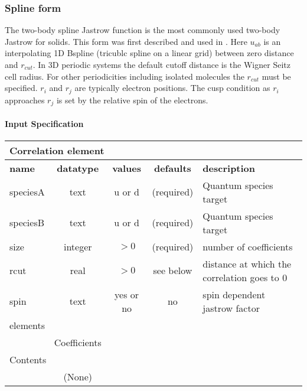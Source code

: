 \subsubsection{Spline form}
\label{sec:twobodyjastrowspline}

The two-body spline Jastrow function is the most commonly used two-body Jastrow for solids. This form 
was first described and used in \cite{EslerKimCeperleyShulenburger2012}.  
Here $u_{ab}$ is an interpolating 1D Bspline (tricublc spline on a linear grid) between 
zero distance and $r_{cut}$. In 3D periodic systems 
the default cutoff distance is the Wigner Seitz cell radius. For other periodicities including isolated 
molecules the $r_{cut}$ must be specified.  $r_i$ and $r_j$ are typically electron positions.  The cusp 
condition as $r_i$ approaches $r_j$ is set by the relative spin of the electrons.

\FloatBarrier
\paragraph{Input Specification}

\FloatBarrier
\begin{table}[h!]
\begin{center}
\begin{tabular}{l c c c l }
\hline
\multicolumn{5}{l}{Correlation element} \\
\hline
\bfseries name & \bfseries datatype & \bfseries values & \bfseries defaults & \bfseries description \\
\hline
speciesA & text & u or d & (required) & Quantum species target \\
speciesB & text & u or d & (required) & Quantum species target \\
size & integer & $> 0$ & (required) & number of coefficients \\
rcut & real & $> 0$ & see below & distance at which the correlation goes to 0 \\
spin & text & yes or no & no & spin dependent jastrow factor \\
\hline
\multicolumn{5}{l}{elements}\\ \hline
& Coefficients & & & \\ \hline
\multicolumn{5}{l}{Contents}\\ \hline
& (None)  & & &  \\ \hline
\end{tabular}
\end{center}
\end{table}


